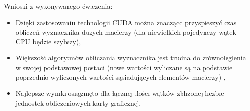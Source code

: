 \documentclass[a4paper,12pt]{article}
\newenvironment{lista}{
\begin{itemize}
  \setlength{\itemsep}{1pt}
  \setlength{\parskip}{0pt}
  \setlength{\parsep}{0pt}
}{\end{itemize}}
\begin{document}
\vspace{1cm}
Wnioski z wykonywanego ćwiczenia:
\begin{lista}
\item Dzięki zastosowaniu technologii CUDA można znacząco przyspieszyć czas obliczeń wyznacznika dużych macierzy (dla niewielkich pojedynczy wątek CPU będzie szybszy),
\item Większość algorytmów obliczania wyznacznika jest trudna do zrównoleglenia w swojej podstawowej postaci (nowe wartości wyliczane są na podstawie poprzednio wyliczonych wartości sąsiadujących elementów macierzy) ,
\item Najlepsze wyniki osiągnięto dla łącznej ilości wątków zbliżonej liczbie jednostek obliczeniowych karty graficznej.
\end{lista}
\end{document}
